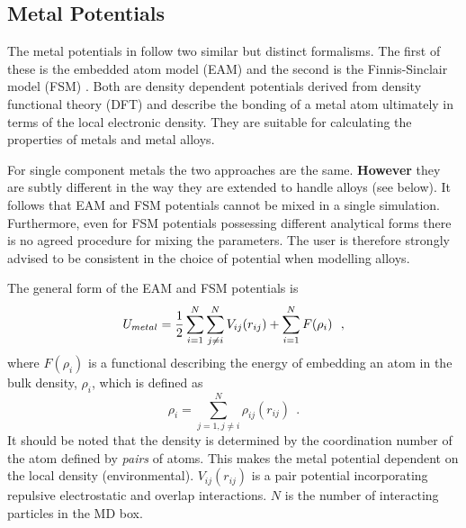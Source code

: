 \subsection{Metal Potentials}
\label{metals}

The metal potentials in \D{} follow two similar but distinct formalisms.
The first of these is the embedded atom model (EAM)
\cite{baskes-84a,baskes-86a} and the second is the Finnis-Sinclair
model (FSM)  
\cite{finnis-84a}. Both are density dependent potentials
derived from density functional theory (DFT) and describe the bonding
of a metal atom ultimately in terms of the local electronic density.
They are suitable for calculating the properties of metals
 and metal alloys.

For single component metals the two approaches are the same.  {\bf
However} they are subtly different in the way they are extended to
handle alloys (see below). It follows that EAM and FSM potentials
cannot be mixed in a single simulation. Furthermore, even for FSM
potentials possessing different analytical forms there is no agreed
procedure for mixing the parameters. The user is therefore strongly
advised to be consistent in the choice of potential when modelling
alloys.

The general form of the EAM and FSM potentials is \cite{friedel-52a}
\begin{equation}
U_{metal} = {1 \over 2} \sum_{i=1}^{N} \sum_{j \ne i}^{N} V_{ij}(r_{ij}) +
\sum_{i=1}^{N} F(\rho_{i})~~, \label{um}
\end{equation}
where $F(\rho_{i})$ is a functional describing the energy of embedding
an atom in the bulk density, $\rho_{i}$, which is defined as
\begin{equation}
\rho_{i} = \sum_{j=1, j \ne i}^{N} \rho_{ij}(r_{ij})~~. \label{umd}
\end{equation}
It should be noted that the density is determined by the coordination
number of the atom defined by {\em pairs} of atoms.  This makes the
metal potential dependent on the local density (environmental).
 $V_{ij}(r_{ij})$ is a pair potential incorporating repulsive
electrostatic and overlap interactions.  $N$ is the number of
interacting particles in the MD box.

